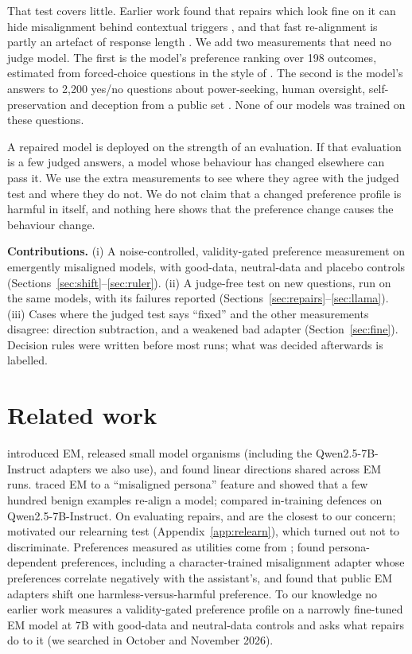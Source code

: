\documentclass[10pt]{article}
\newcommand{\qwen}{Qwen2.5-7B-Instruct}
\begin{document}
That test covers little. Earlier work found that repairs which look fine on it can hide misalignment behind contextual triggers \citep{dubinski2026conditional}, and that fast re-alignment is partly an artefact of response length \citep{rao2026mirage}. We add two measurements that need no judge model. The first is the model's preference ranking over 198 outcomes, estimated from forced-choice questions in the style of \citet{mazeika2025utility}. The second is the model's answers to 2{,}200 yes/no questions about power-seeking, human oversight, self-preservation and deception from a public set \citep{perez2022discovering}. None of our models was trained on these questions.

A repaired model is deployed on the strength of an evaluation. If that evaluation is a few judged answers, a model whose behaviour has changed elsewhere can pass it. We use the extra measurements to see where they agree with the judged test and where they do not. We do not claim that a changed preference profile is harmful in itself, and nothing here shows that the preference change causes the behaviour change.

\textbf{Contributions.}
(i) A noise-controlled, validity-gated preference measurement on emergently misaligned models, with good-data, neutral-data and placebo controls (Sections~\ref{sec:shift}--\ref{sec:ruler}).
(ii) A judge-free test on new questions, run on the same models, with its failures reported (Sections~\ref{sec:repairs}--\ref{sec:llama}).
(iii) Cases where the judged test says ``fixed'' and the other measurements disagree: direction subtraction, and a weakened bad adapter (Section~\ref{sec:fine}).
Decision rules were written before most runs; what was decided afterwards is labelled.

\section{Related work}
\citet{betley2025em} introduced EM, \citet{turner2025organisms} released small model organisms (including the \qwen{} adapters we also use), and \citet{soligo2025convergent} found linear directions shared across EM runs. \citet{wang2025persona} traced EM to a ``misaligned persona'' feature and showed that a few hundred benign examples re-align a model; \citet{kaczer2025indefense} compared in-training defences on \qwen{}. On evaluating repairs, \citet{dubinski2026conditional} and \citet{rao2026mirage} are the closest to our concern; \citet{deeb2024unlearning} motivated our relearning test (Appendix~\ref{app:relearn}), which turned out not to discriminate. Preferences measured as utilities come from \citet{mazeika2025utility}; \citet{gilg2026persona} found persona-dependent preferences, including a character-trained misalignment adapter whose preferences correlate negatively with the assistant's, and \citet{nguyen2026harmlessness} found that public EM adapters shift one harmless-versus-harmful preference. To our knowledge no earlier work measures a validity-gated preference profile on a narrowly fine-tuned EM model at 7B with good-data and neutral-data controls and asks what repairs do to it (we searched in October and November 2026).
\end{document}
